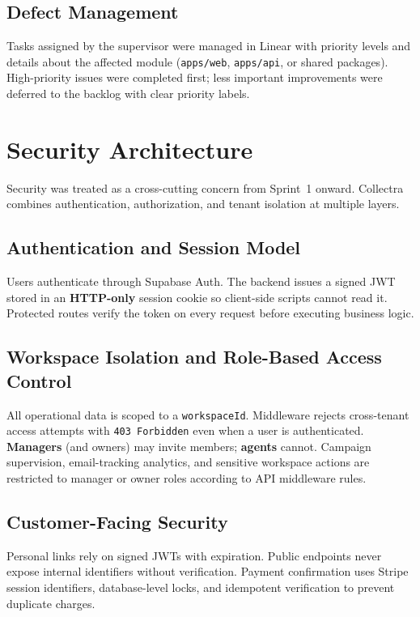 \documentclass[12pt,a4paper]{report}
\begin{document}
\subsection{Defect Management}

Tasks assigned by the supervisor were managed in Linear with priority levels and
details about the affected module (\texttt{apps/web}, \texttt{apps/api}, or shared
packages).
High-priority issues were completed first; less important improvements were deferred
to the backlog with clear priority labels.

\section{Security Architecture}
\label{sec:security}

Security was treated as a cross-cutting concern from Sprint~1 onward.
Collectra combines authentication, authorization, and tenant isolation at multiple
layers.

\subsection{Authentication and Session Model}

Users authenticate through Supabase Auth.
The backend issues a signed JWT stored in an \textbf{HTTP-only} session cookie so
client-side scripts cannot read it.
Protected routes verify the token on every request before executing business logic.

\subsection{Workspace Isolation and Role-Based Access Control}

All operational data is scoped to a \texttt{workspaceId}.
Middleware rejects cross-tenant access attempts with \texttt{403 Forbidden} even when
a user is authenticated.
\textbf{Managers} (and owners) may invite members; \textbf{agents} cannot.
Campaign supervision, email-tracking analytics, and sensitive workspace actions are
restricted to manager or owner roles according to API middleware rules.

\subsection{Customer-Facing Security}

Personal links rely on signed JWTs with expiration.
Public endpoints never expose internal identifiers without verification.
Payment confirmation uses Stripe session identifiers, database-level locks, and
idempotent verification to prevent duplicate charges.
\end{document}
